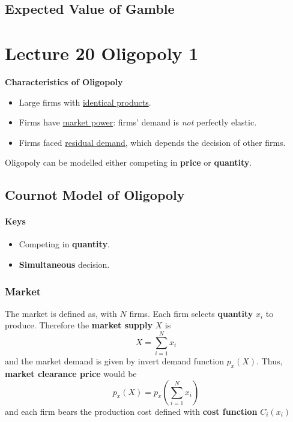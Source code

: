 \documentclass[]{article}
\begin{document}
        \subsection{Expected Value of Gamble}
        
    \section{Lecture 20 Oligopoly 1}
        \begin{remark}
            \textbf{Characteristics of Oligopoly}
            \begin{itemize}
                \item Large firms with \ul{identical products}.
                \item Firms have \ul{market power}: firms' demand is \emph{not} perfectly elastic.
                \item Firms faced \ul{residual demand}, which depends the decision of other firms.
            \end{itemize}
        \end{remark}
        
        \begin{remark}
            Oligopoly can be modelled either competing in \textbf{price} or \textbf{quantity}.
        \end{remark}
        
        \subsection{Cournot Model of Oligopoly}
            \paragraph{Keys}
                \begin{itemize}
                    \item Competing in \textbf{quantity}.
                    \item \textbf{Simultaneous} decision.
                \end{itemize}
                
            \subsubsection{Market}
                \begin{definition}
                    The market is defined as, with $N$ firms. Each firm selects \textbf{quantity} $x_i$ to produce. Therefore the \textbf{market supply} $X$ is 
                    \[
                        X = \sum_{i=1}^N{x_i}
                    \]
                    and the market demand is given by invert demand function $p_x(X)$. Thus, \textbf{market clearance price} would be 
                    \[
                        p_x(X) = p_x(\sum_{i=1}^N{x_i})
                    \]
                    and each firm bears the production cost defined with \textbf{cost function} $C_i(x_i)$
                \end{definition}
                
\end{document}
